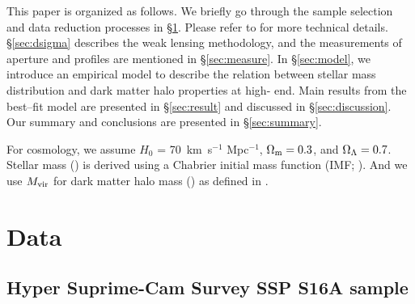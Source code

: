 \documentclass[a4paper,fleqn,usenatbib]{mnras}
\begin{document}
    

    This paper is organized as follows. 
    We briefly go through the sample selection and data reduction processes in 
    \S \ref{sec:data}.  
    Please refer to  for more technical details.
    \S \ref{sec:dsigma} describes the weak lensing methodology, and the 
    measurements of aperture \mstar{} and \mden{} profiles are mentioned in 
    \S \ref{sec:measure}.
    In \S \ref{sec:model}, we introduce an empirical model to describe the relation
    between stellar mass distribution and dark matter halo properties at 
    high-\mstar{} end. 
    Main results from the best--fit model are presented in \S \ref{sec:result} and 
    discussed in \S \ref{sec:discussion}. 
    Our summary and conclusions are presented in \S \ref{sec:summary}.

    
    For cosmology, we assume $H_0$ = 70~km~s$^{-1}$ Mpc$^{-1}$, 
    ${\Omega}_{\rm m}=0.3$, and ${\Omega}_{\rm \Lambda}=0.7$.
    Stellar mass (\mstar{}) is derived using a Chabrier initial mass function 
    (IMF; \citealt{Chabrier2003}). 
    And we use $M_{\rm vir}$ for dark matter halo mass (\mhalo{}) as 
    defined in \citealt{BryanNorman1998}.
    


\section{Data}
    \label{sec:data}
    
\subsection{ Hyper Suprime-Cam Survey SSP S16A sample}
    \label{sec:s16a}      
    
\end{document}
